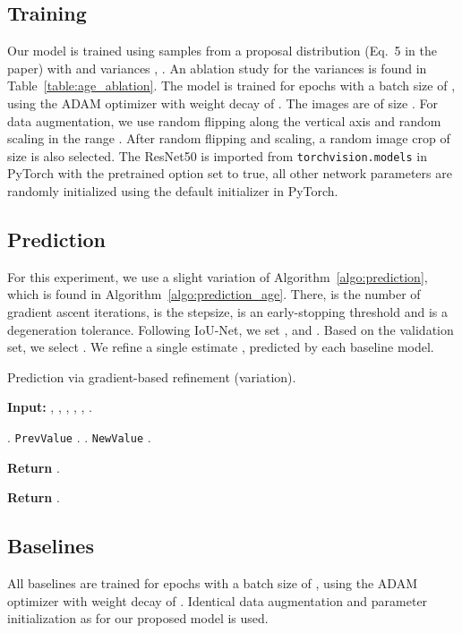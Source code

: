 \documentclass[runningheads]{llncs}
\begin{document}
\begin{appendices}
\subsection{Training}
Our model is trained using  samples from a proposal distribution  (Eq.~5 in the paper) with  and variances , . An ablation study for the variances is found in Table~\ref{table:age_ablation}. The model is trained for  epochs with a batch size of , using the ADAM optimizer with weight decay of . The images  are of size . For data augmentation, we use random flipping along the vertical axis and random scaling in the range . After random flipping and scaling, a random image crop of size  is also selected. The ResNet50 is imported from \texttt{torchvision.models} in PyTorch with the pretrained option set to true, all other network parameters are randomly initialized using the default initializer in PyTorch.



\subsection{Prediction}
For this experiment, we use a slight variation of Algorithm~\ref{algo:prediction}, which is found in Algorithm~\ref{algo:prediction_age}. There,  is the number of gradient ascent iterations,  is the stepsize,  is an early-stopping threshold and  is a degeneration tolerance. Following IoU-Net, we set ,  and . Based on the validation set, we select . We refine a single estimate , predicted by each baseline model.

\begin{algorithm*}
\caption{Prediction via gradient-based refinement (variation).}\label{algo:prediction_age}
\textbf{Input:} , , , , , . \begin{algorithmic}[1]
    \State .
    \For{\texttt{}}
        \State \texttt{PrevValue}  .
        \State .
        \State \texttt{NewValue}  .
        
        \State \textbf{Return} .
        \EndIf

    \EndFor
    \State \textbf{Return} .
\end{algorithmic}
\end{algorithm*}



\subsection{Baselines}
All baselines are trained for  epochs with a batch size of , using the ADAM optimizer with weight decay of . Identical data augmentation and parameter initialization as for our proposed model is used.


\end{appendices}
\end{document}
